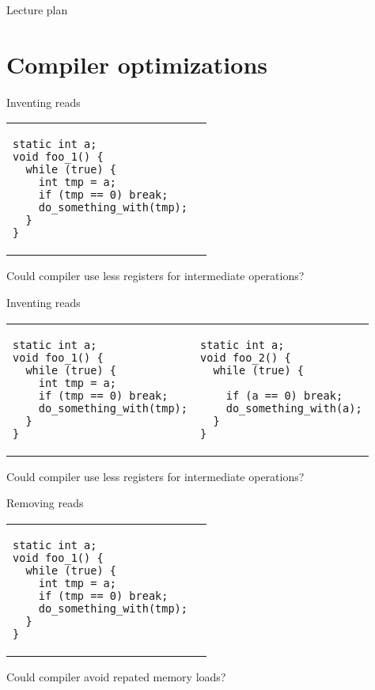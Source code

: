 \begin{frame}{Lecture plan}
\tableofcontents
\end{frame}


\section{Compiler optimizations}
\showTOC


\begin{frame}[t,fragile]{Inventing reads}

\begin{tabular}{p{} p{}}

\begin{verbatim}
static int a;
void foo_1() {
  while (true) {
    int tmp = a;
    if (tmp == 0) break;
    do_something_with(tmp);
  }
}
\end{verbatim}

&

\end{tabular}

\pause
Could compiler use less registers for intermediate operations?

\end{frame}

\begin{frame}{Inventing reads}

\begin{tabular}{p{} p{}}

\begin{verbatim}
static int a;
void foo_1() {
  while (true) {
    int tmp = a;
    if (tmp == 0) break;
    do_something_with(tmp);
  }
}
\end{verbatim}

&
\begin{verbatim}
static int a;
void foo_2() {
  while (true) {

    if (a == 0) break;
    do_something_with(a);
  }
}
\end{verbatim}

\end{tabular}

Could compiler use less registers for intermediate operations?

\end{frame}


\begin{frame}[t,fragile]{Removing reads}

\begin{tabular}{p{} p{}}

\begin{verbatim}
static int a;
void foo_1() {
  while (true) {
    int tmp = a;
    if (tmp == 0) break;
    do_something_with(tmp);
  }
}
\end{verbatim}

&

\end{tabular}

\pause

Could compiler avoid repated memory loads?

\end{frame}



